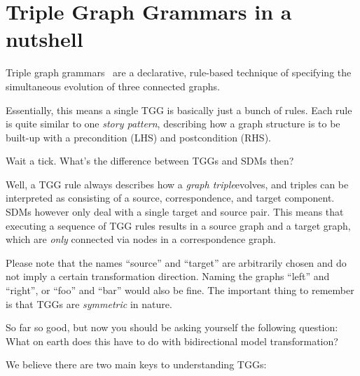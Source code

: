 \section{Triple Graph Grammars in a nutshell}
\label{sec:nutshell}
\genHeader

Triple graph grammars~\cite{tgg:schuerr_94,sk2008,Klar2010} are a declarative, rule-based technique of specifying the simultaneous evolution of three connected
graphs. 

Essentially, this means a single TGG is basically just a bunch of rules. Each rule is quite similar to one \emph{story pattern}, describing how a graph
structure is to be built-up with a precondition (LHS) and postcondition (RHS). 

Wait a tick. What's the difference between TGGs and SDMs then?

Well, a TGG rule always describes how a \emph{graph triple}evolves, and triples can be interpreted as consisting of a source,
correspondence, and target component. SDMs however only deal with a single target and source pair. This means that executing a sequence of TGG rules results in
a source graph and a target graph, which are \emph{only} connected via nodes in a correspondence graph. 

Please note that the names ``source'' and ``target'' are arbitrarily chosen and do not imply a certain transformation direction. Naming the graphs ``left'' and ``right'', or ``foo'' and ``bar'' would also be fine. The
important thing to remember is that TGGs are \emph{symmetric} in nature.

So far so good, but now you should be asking yourself the following question: What on earth does this have to do with bidirectional model transformation?

We believe there are two main keys to understanding TGGs:

